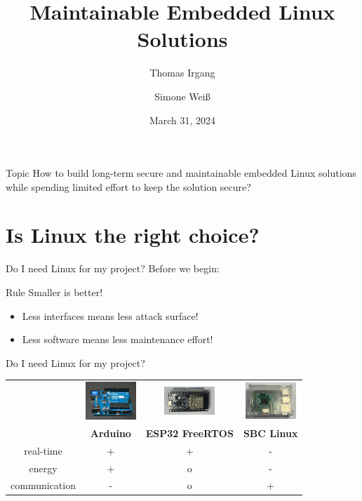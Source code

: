 \documentclass{beamer}
\title{Maintainable Embedded Linux Solutions}
\author{Thomas Irgang \and Simone Weiß}
\institute{EASTERHEGG 2024 - RABBIT PROTOTYPING}
\date{March 31, 2024}
\begin{document}
\begin{frame}
    \titlepage
\end{frame}

\begin{frame}
	\begin{block}{Topic}
		How to build long-term secure and maintainable embedded Linux solutions
		while spending limited effort to keep the solution secure?
	\end{block}
\end{frame}

\section{Is Linux the right choice?}

\begin{frame}{Do I need Linux for my project?}
	Before we begin:

	\begin{block}{Rule}
		Smaller is better!
	\end{block}
	
	\begin{itemize}
		\item Less interfaces means less attack surface!
		\item Less software means less maintenance effort!
	\end{itemize}
\end{frame}

\begin{frame}{Do I need Linux for my project?}
	\begin{tabular}{cccc}
	&\includegraphics[width=1.9cm]{assets/Pixabay_Arduino_integrated-circuit-441289_1280.jpg} &
	\includegraphics[width=1.9cm]{assets/ESP32.png} & 
	\includegraphics[width=1.9cm]{assets/Raspberry_Pi.png} \\
	&\textbf{Arduino} & \textbf{ESP32 FreeRTOS} & \textbf{SBC Linux} \\
	real-time & + &  + & - \\
	energy & + & o & - \\
	communication & - & o & + \\
	\end{tabular}
\end{frame}
\end{document}
